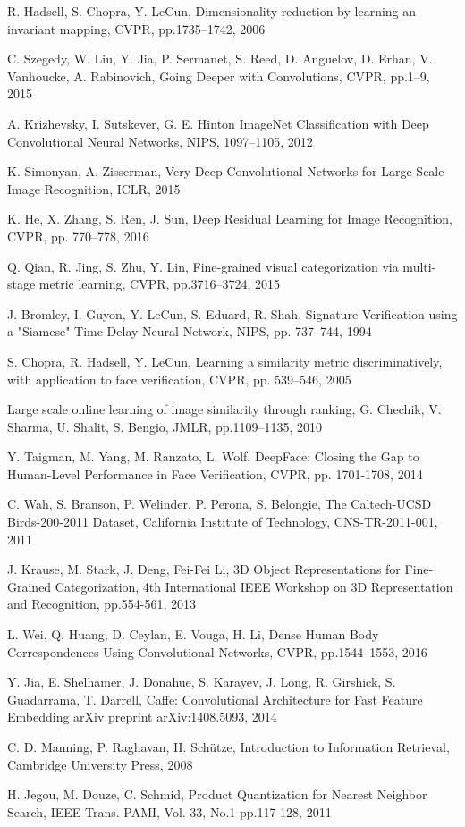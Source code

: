 \documentclass[9pt,technote,compsoc]{./sty/IEEEtran}
\begin{document}
\begin{thebibliography}{1}
R. Hadsell, S. Chopra, Y. LeCun,
Dimensionality reduction by learning an invariant mapping,
CVPR, pp.1735--1742, 2006

C. Szegedy, W. Liu, Y. Jia, P. Sermanet, S. Reed, D. Anguelov, D. Erhan, V. Vanhoucke, A. Rabinovich,
Going Deeper with Convolutions, CVPR, pp.1--9, 2015

A. Krizhevsky, I. Sutskever, G. E. Hinton
ImageNet Classification with Deep Convolutional Neural Networks,
NIPS, 1097--1105, 2012

K. Simonyan, A. Zisserman,
Very Deep Convolutional Networks for Large-Scale Image Recognition,
ICLR, 2015

K. He, X. Zhang, S. Ren, J. Sun,
Deep Residual Learning for Image Recognition,
CVPR, pp. 770--778, 2016

Q. Qian, R. Jing, S. Zhu, Y. Lin, 
Fine-grained visual categorization via multi-stage metric learning,
CVPR, pp.3716--3724, 2015

J. Bromley,  I. Guyon, Y. LeCun, S. Eduard, R. Shah, 
Signature Verification using a "Siamese" Time Delay Neural Network,
NIPS, pp. 737--744, 1994

S. Chopra, R. Hadsell, Y. LeCun, 
Learning a similarity metric discriminatively, with application to face verification,
CVPR, pp. 539--546, 2005

Large scale online learning of image similarity through ranking,
G. Chechik, V. Sharma, U. Shalit, S. Bengio,
JMLR, pp.1109--1135, 2010

Y. Taigman, M. Yang, M. Ranzato, L. Wolf,
DeepFace: Closing the Gap to Human-Level Performance in Face Verification,
CVPR, pp. 1701-1708, 2014

C. Wah, S. Branson, P. Welinder, P. Perona, S. Belongie, 
The Caltech-UCSD Birds-200-2011 Dataset,
California Institute of Technology, CNS-TR-2011-001, 2011

J. Krause, M. Stark, J. Deng, Fei-Fei Li,
3D Object Representations for Fine-Grained Categorization,
4th International IEEE Workshop on 3D Representation and Recognition,
pp.554-561, 2013

L. Wei, Q. Huang, D. Ceylan, E. Vouga, H. Li,
Dense Human Body Correspondences Using Convolutional Networks,
CVPR, pp.1544--1553, 2016

Y. Jia, E. Shelhamer, J. Donahue, S. Karayev, J. Long, R. Girshick, S. Guadarrama, T. Darrell,
Caffe: Convolutional Architecture for Fast Feature Embedding
arXiv preprint arXiv:1408.5093, 2014


C. D. Manning, P. Raghavan, H. Sch\"{u}tze,
Introduction to Information Retrieval,	Cambridge University Press, 2008

H. Jegou, M. Douze, C. Schmid, 
Product Quantization for Nearest Neighbor Search,
IEEE Trans. PAMI, Vol. 33, No.1 pp.117-128, 2011
\end{thebibliography}
\end{document}
